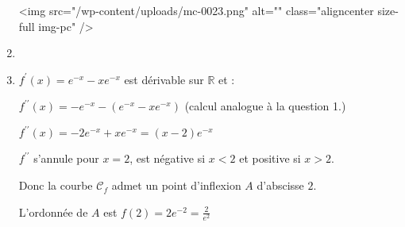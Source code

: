 \begin{corrige}
\begin{enumerate}
\begin{center}
\begin{extern}
{
      }
   \end{extern}
\end{center}
<img src="/wp-content/uploads/mc-0023.png" alt="" class="aligncenter size-full  img-pc" />
          \item

\begin{center}
\end{center}

          \item
          $f^{\prime}\left(x\right)=e^{-x}-xe^{-x}$ est dérivable sur $\mathbb{R}$ et :
          \par
          $f^{\prime\prime}\left(x\right)=-e^{-x}-\left(e^{-x}-xe^{-x}\right)  $ (calcul analogue à la question 1.)
          \par
          $f^{\prime\prime}\left(x\right)=-2e^{-x}+xe^{-x}=\left(x-2\right)e^{-x}$
          \par
          $f^{\prime\prime}$ s'annule pour $x=2$, est négative si $x < 2$ et positive si $x > 2$.
          \par
          Donc la courbe $\mathscr C_{f}$ admet un point d'inflexion $A$ d'abscisse $2$.
          \par
          L'ordonnée de $A$ est $f\left(2\right)=2e^{-2}=\frac{2}{e^{2}}$
     \end{enumerate}
\end{corrige}
